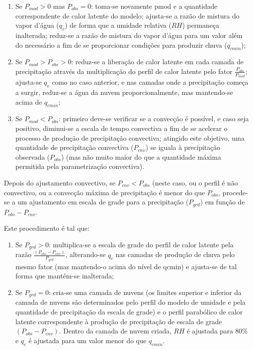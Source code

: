 \begin{enumerate}
\item Se $P_{mod}>0$ mas $P_{obs}=0$: toma-se novamente pmod e a quantidade correspondente de calor latente do modelo; ajusta-se a razão de mistura do vapor d'água ($q_{v}$) de forma que a umidade relativa ($RH$) permaneça inalterada; reduz-se a razão de mistura do vapor d'água para um valor além do necessário a fim de se proporcionar condições para produzir chuva ($q_{cmin}$);
\item Se $P_{mod}>P_{obs}>0$: reduz-se a liberação de calor latente em cada camada de precipitação através da multiplicação do perfil de calor latente pelo fator $\frac{P_{obs}}{P_{mod}}$; ajusta-se $q_{v}$ como no caso anterior, e nas camadas onde a precipitação começa a surgir, reduz-se a água da nuvem proporcionalmente, mas mantendo-se acima de $q_{cmin}$;
\item Se $P_{mod}<P_{obs}$: primeiro deve-se verificar se a convecção é possível, e caso seja positivo, diminui-se a escala de tempo convectiva a fim de se acelerar o processo de produção de precipitação convectiva; atingido este objetivo, uma quantidade de precipitação convectiva ($P_{cnv}$) se iguala à precipitação observada ($P_{obs}$) (mas não muito maior do que a quantidade máxima permitida pela parametrização convectiva).
\end{enumerate}

Depois do ajustamento convectivo, se $P_{cnv}<P_{obs}$ (neste caso, ou o perfil é não convectivo, ou a convecção máxima de precipitação é menor do que $P_{obs}$, procede-se a um ajustamento em escala de grade para a precipitação ($P_{grd}$) em função de $P_{obs}-P_{cnv}$.

Este procedimento é tal que:

\begin{enumerate}
\item Se $P_{grd}>0$: multiplica-se a escala de grade do perfil de calor latente pela razão $\frac{(P_{obs}-P_{cnv})}{P_{grd}}$, alterando-se $q_{c}$ nas camadas de produção de chuva pelo mesmo fator (mas mantendo-o acima do nível de qcmin) e ajusta-se de tal forma que mantém-se inalterada;
\item Se $P_{grd}=0$: cria-se uma camada de nuvens (os limites superior e inferior da camada de nuvens são determinados pelo perfil do modelo de umidade e pela quantidade de precipitação da escala de grade) e o perfil parabólico de calor latente correspondente à produção de precipitação de escala de grade $(P_{obs}-P_{cnv})$. Dentro da camada de nuvem criada, $RH$ é ajustada para 80\% e $q_{c}$ é ajustada para um valor menor do que $q_{cmin}$.
\end{enumerate}

